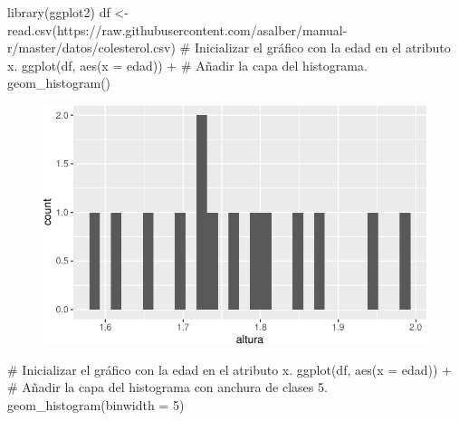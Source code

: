 \documentclass[
  a4paper,
]{scrreport}
\newenvironment{Shaded}{\begin{snugshade}}{\end{snugshade}}
\newcommand{\AttributeTok}[1]{\textcolor[rgb]{0.40,0.45,0.13}{#1}}
\newcommand{\CommentTok}[1]{\textcolor[rgb]{0.37,0.37,0.37}{#1}}
\newcommand{\DecValTok}[1]{\textcolor[rgb]{0.68,0.00,0.00}{#1}}
\newcommand{\FunctionTok}[1]{\textcolor[rgb]{0.28,0.35,0.67}{#1}}
\newcommand{\NormalTok}[1]{\textcolor[rgb]{0.00,0.23,0.31}{#1}}
\newcommand{\OtherTok}[1]{\textcolor[rgb]{0.00,0.23,0.31}{#1}}
\newcommand{\SpecialCharTok}[1]{\textcolor[rgb]{0.37,0.37,0.37}{#1}}
\newcommand{\StringTok}[1]{\textcolor[rgb]{0.13,0.47,0.30}{#1}}
\theoremstyle{definition}
\theoremstyle{definition}
\theoremstyle{remark}
\begin{document}
\begin{Shaded}
\begin{Highlighting}[]
\FunctionTok{library}\NormalTok{(ggplot2)}
\NormalTok{df }\OtherTok{\textless{}{-}} \FunctionTok{read.csv}\NormalTok{(}\StringTok{\textquotesingle{}https://raw.githubusercontent.com/asalber/manual{-}r/master/datos/colesterol.csv\textquotesingle{}}\NormalTok{)}
\CommentTok{\# Inicializar el gráfico con la edad en el atributo x.}
\FunctionTok{ggplot}\NormalTok{(df, }\FunctionTok{aes}\NormalTok{(}\AttributeTok{x =}\NormalTok{ edad)) }\SpecialCharTok{+}
\CommentTok{\# Añadir la capa del histograma.}
    \FunctionTok{geom\_histogram}\NormalTok{()}
\end{Highlighting}
\end{Shaded}

\begin{figure}[H]

{\centering \includegraphics{./07-graficos_files/figure-pdf/unnamed-chunk-15-1.pdf}

}

\end{figure}

\begin{Shaded}
\begin{Highlighting}[]
\CommentTok{\# Inicializar el gráfico con la edad en el atributo x.}
\FunctionTok{ggplot}\NormalTok{(df, }\FunctionTok{aes}\NormalTok{(}\AttributeTok{x =}\NormalTok{ edad)) }\SpecialCharTok{+}
\CommentTok{\# Añadir la capa del histograma con anchura de clases 5.}
    \FunctionTok{geom\_histogram}\NormalTok{(}\AttributeTok{binwidth =} \DecValTok{5}\NormalTok{)}
\end{Highlighting}
\end{Shaded}
\end{document}
